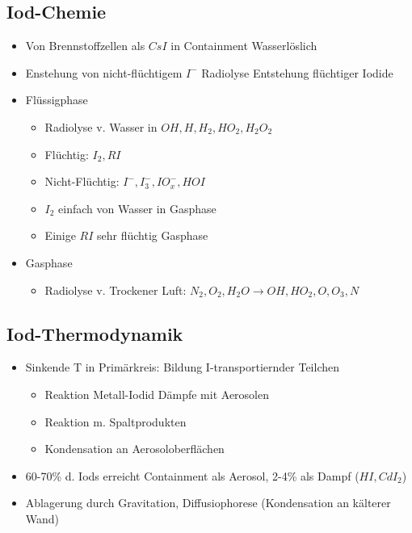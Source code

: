 \documentclass[12pt]{article}
\begin{document}
\subsection{Iod-Chemie}
\begin{itemize}[noitemsep]
	\item Von Brennstoffzellen als \(CsI\) in Containment \textrightarrow Wasserlöslich
	\item Enstehung von nicht-flüchtigem \(I^-\) \textrightarrow Radiolyse \textrightarrow Entstehung flüchtiger Iodide
	\item Flüssigphase
		\begin{itemize}[noitemsep]
			\item Radiolyse v. Wasser in \(OH, H, H_2, HO_2, H_2O_2\)
			\item Flüchtig: \(I_2, RI\)
			\item Nicht-Flüchtig: \(I^-, I^-_3, IO^-_x, HOI\)
			\item \(I_2\) einfach von Wasser in Gasphase
			\item Einige \(RI\) sehr flüchtig \textrightarrow Gasphase
		\end{itemize}
	\item Gasphase
		\begin{itemize}[noitemsep]
			\item Radiolyse v. Trockener Luft: \(N_2, O_2, H_2O \rightarrow OH, HO_2, O, O_3, N\)
		\end{itemize}
\end{itemize}

\subsection{Iod-Thermodynamik}
\begin{itemize}[noitemsep]
	\item Sinkende T in Primärkreis: Bildung I-transportiernder Teilchen
		\begin{itemize}[noitemsep]
			\item Reaktion Metall-Iodid Dämpfe mit Aerosolen
			\item Reaktion m. Spaltprodukten
			\item Kondensation an Aerosoloberflächen
		\end{itemize}
	\item 60-70\% d. Iods erreicht Containment als Aerosol, 2-4\% als Dampf (\(HI, CdI_2\))
	\item Ablagerung durch Gravitation, Diffusiophorese (Kondensation an kälterer Wand)
\end{itemize}
\end{document}
